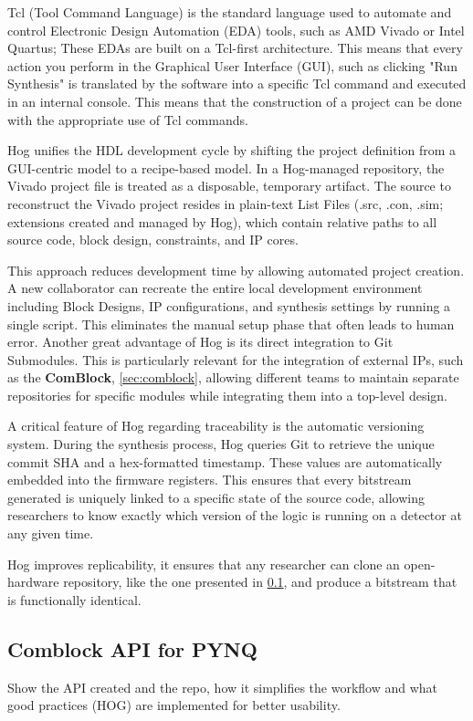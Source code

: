Tcl (Tool Command Language) is the standard language used to automate and control Electronic Design Automation (EDA) tools, such as AMD Vivado or Intel Quartus; These EDAs are built on a Tcl-first architecture. This means that every action you perform in the Graphical User Interface (GUI), such as clicking "Run Synthesis" is translated by the software into a specific Tcl command and executed in an internal console. This means that the construction of a project can be done with the appropriate use of Tcl commands.


Hog unifies the HDL development cycle by shifting the project definition from a GUI-centric model to a recipe-based model. In a Hog-managed repository, the Vivado project file is treated as a disposable, temporary artifact. The source to reconstruct the Vivado project resides in plain-text List Files (.src, .con, .sim; extensions created and managed by Hog), which contain relative paths to all source code, block design, constraints, and IP cores.

This approach reduces development time by allowing automated project creation. A new collaborator can recreate the entire local development environment including Block Designs, IP configurations, and synthesis settings by running a single script. This eliminates the manual setup phase that often leads to human error. Another great advantage of Hog is its direct integration to Git Submodules. This is particularly relevant for the integration of external IPs, such as the \textbf{ComBlock}, \cref{sec:comblock}, allowing different teams to maintain separate repositories for specific modules while integrating them into a top-level design. 

A critical feature of Hog regarding traceability is the automatic versioning system. During the synthesis process, Hog queries Git to retrieve the unique commit SHA and a hex-formatted timestamp. These values are automatically embedded into the firmware registers. This ensures that every bitstream generated is uniquely linked to a specific state of the source code, allowing researchers to know exactly which version of the logic is running on a detector at any given time.


Hog improves replicability, it ensures that any researcher can clone an open-hardware repository, like the one presented in \cref{sec:comblock_API}, and produce a bitstream that is functionally identical. 


\subsection{Comblock API for PYNQ} \label{sec:comblock_API}
Show the API created and the repo, how it simplifies the workflow and what good practices (HOG) are implemented for better usability. 



